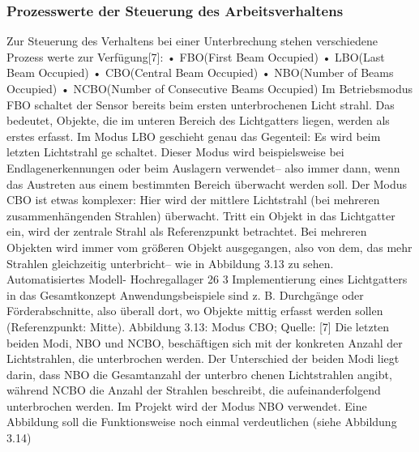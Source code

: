 \subsubsection{Prozesswerte der Steuerung des Arbeitsverhaltens}
Zur Steuerung des Verhaltens bei einer Unterbrechung stehen verschiedene Prozess
werte zur Verfügung[7]:
• FBO(First Beam Occupied)
• LBO(Last Beam Occupied)
• CBO(Central Beam Occupied)
• NBO(Number of Beams Occupied)
• NCBO(Number of Consecutive Beams Occupied)
Im Betriebsmodus FBO schaltet der Sensor bereits beim ersten unterbrochenen Licht
strahl. Das bedeutet, Objekte, die im unteren Bereich des Lichtgatters liegen, werden
als erstes erfasst.
Im Modus LBO geschieht genau das Gegenteil: Es wird beim letzten Lichtstrahl ge
schaltet.
Dieser Modus wird beispielsweise bei Endlagenerkennungen oder beim Auslagern
verwendet– also immer dann, wenn das Austreten aus einem bestimmten Bereich
überwacht werden soll.
Der Modus CBO ist etwas komplexer: Hier wird der mittlere Lichtstrahl (bei mehreren
zusammenhängenden Strahlen) überwacht. Tritt ein Objekt in das Lichtgatter ein, wird
der zentrale Strahl als Referenzpunkt betrachtet. Bei mehreren Objekten wird immer
vom größeren Objekt ausgegangen, also von dem, das mehr Strahlen gleichzeitig
unterbricht– wie in Abbildung 3.13 zu sehen.
Automatisiertes Modell- Hochregallager
26
3 Implementierung eines Lichtgatters in das Gesamtkonzept
Anwendungsbeispiele sind z. B. Durchgänge oder Förderabschnitte, also überall dort,
wo Objekte mittig erfasst werden sollen (Referenzpunkt: Mitte).
Abbildung 3.13: Modus CBO; Quelle: [7]
Die letzten beiden Modi, NBO und NCBO, beschäftigen sich mit der konkreten Anzahl
der Lichtstrahlen, die unterbrochen werden.
Der Unterschied der beiden Modi liegt darin, dass NBO die Gesamtanzahl der unterbro
chenen Lichtstrahlen angibt, während NCBO die Anzahl der Strahlen beschreibt, die
aufeinanderfolgend unterbrochen werden.
Im Projekt wird der Modus NBO verwendet. Eine Abbildung soll die Funktionsweise
noch einmal verdeutlichen (siehe Abbildung 3.14)

